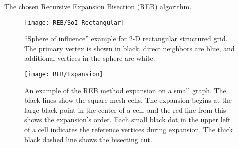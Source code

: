 {{{{        \begin{algorithm}
          \centering
          \caption{The chosen Recursive Expansion Bisection (REB) algorithm.}
          \label{alg:Recursive Expansion Bisection}
          \begin{algorithmic}[1]
            \EndProcedure
          \end{algorithmic}
        \end{algorithm}

        \begin{figure}
          \centering
          \texttt{[image: REB/SoI\_Rectangular]}
          \caption{
              ``Sphere of influence'' example for 2-D rectangular structured grid.
              The primary vertex is shown in black, direct neighbors are blue, and additional vertices in the sphere are white.
              \label{fig:Spatial Decomposition:Sphere of Influence}
          }
        \end{figure}

        \begin{figure}
          \centering
          \texttt{[image: REB/Expansion]}
          \caption{
              An example of the \ac{REB} method expansion on a small graph.
              The black lines show the square mesh cells.
              The expansion begins at the large black point in the center of a cell, and the red line from this shows the expansion's order.
              Each small black dot in the upper left of a cell indicates the reference vertices during expansion.
              The thick black dashed line shows the bisecting cut.
              \label{fig:Spatial Decomposition:REB Expansion Order}
          }
        \end{figure}

      }
    }
  }
}
